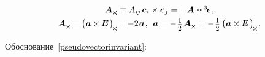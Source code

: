 \begin{otherlanguage}{russian}
\nopagebreak\vspace{-0.15em}\begin{equation}\label{pseudovectorinvariant}
\begin{array}{c}
\bm{A}_{\Xcompanion} \equiv A_{i\hspace{-0.1ex}j} \hspace{.25ex} \bm{e}_i \times \bm{e}_j = - \hspace{0.1ex} \bm{A} \hspace{0.1ex} \dotdotp \levicivitatensor
\hspace{.2ex}, \\[.3em]
%
\bm{A}_{\Xcompanion} \hspace{-0.16ex} = \left(^{\mathstrut} \hspace{-0.1ex} \bm{a} \times\hspace{-0.1ex} \bm{E} \hspace{.2ex} \right)_{\hspace{-0.25ex}\Xcompanion} \hspace{-0.25ex} = \hspace{-0.12ex}
- 2 \hspace{0.16ex} \bm{a} \hspace{.2ex},\:\:
\bm{a} = - \hspace{.2ex} \smalldisplaystyleonehalf \hspace{.25ex} \bm{A}_{\Xcompanion} = - \hspace{.2ex} \smalldisplaystyleonehalf \left(^{\mathstrut} \hspace{-0.1ex} \bm{a} \times\hspace{-0.1ex} \bm{E} \hspace{.2ex} \right)_{\hspace{-0.25ex}\Xcompanion} \hspace{-0.2ex}.
\end{array}
\end{equation}

Обоснование~\eqref{pseudovectorinvariant}:


\end{otherlanguage}

